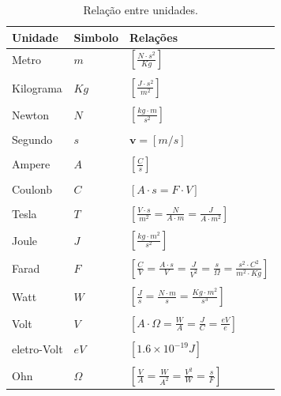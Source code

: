 \documentclass[12pt,oneside,a4paper]{abntex2}
\begin{document}
    \begin{table}[ht]
  
    \label{tabela1}
    \begin{center}
    \begin{tabular}{lll}
    \hline 
    Unidade & Simbolo & Relações \\ 
    \hline 
    Metro & $m$  & $\left[ \frac{N \cdot s^2}{Kg} \right]$ \\ 
     \\
    Kilograma  & $Kg$ & $\left[ \frac{J \cdot s^2}{m^2} \right]$  \\ 
     \\
    Newton & $N$  & $\left[  \frac{kg \cdot m}{s^2}\right]$ \\ 
     \\   
    Segundo & $s$  & $\bm{v} = \left[ m/s \right]$ \\ 
     \\
    Ampere & $A$  & $\left[ \frac{C}{s}\right]$ \\ 
     \\
    Coulonb & $C$  & $\left[ A \cdot s = F \cdot V\right]$ \\ 
     \\
    Tesla & $T$  & $\left[ \frac{V \cdot s}{m^2} = \frac{N}{A \cdot m} = \frac{J}{A \cdot m^2} \right]$ \\ 
     \\
    Joule & $J$  & $\left[ \frac{kg \cdot m^2}{s^2} \right]$ \\ 
    \\
    Farad & $F$  & $\left[ \frac{C}{V} = \frac{A \cdot s}{V} = \frac{J}{V^2} = \frac{s}{\Omega} = \frac{s^2 \cdot C^2}{m^2 \cdot Kg} \right]$ \\ 
      \\  
    Watt & $W$  & $\left[ \frac{J}{s} = \frac{N \cdot m}{s} = \frac{Kg \cdot m^2}{s^3} \right]$ \\ 
    \\
    Volt & $V$  & $\left[ A \cdot \Omega = \frac{W}{A} = \frac{J}{C} = \frac{eV}{e}\right]$ \\ 
     \\
    eletro-Volt & $eV$  & $\left[ 1.6 \times 10^{-19}J \right]$ \\
    \\
    Ohn & $\Omega$  & $\left[ \frac{V}{A} = \frac{W}{A^2} = \frac{V^2}{W} = \frac{s}{F} \right]$ \\ 
  
      
    \hline

    \end{tabular}
          \caption{Relação entre unidades.}
    \end{center}         
    \end{table}
\end{document}
